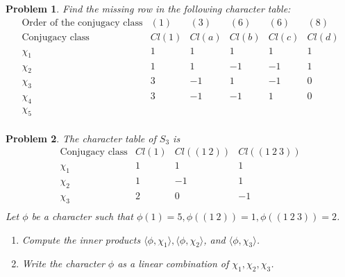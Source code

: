 \documentclass[10pt]{article}
\newcommand{\sk}{\vskip 10mm}
\theoremstyle{plain}
\newtheorem{problem}{Problem}
\theoremstyle{remark}
\begin{document}
\sk

\begin{problem}
  Find the missing row in the following character table:
  \[
    \begin{array}{c|ccccc}
      \text{Order of the conjugacy class} & (1) & (3) & (6) & (6) & (8)\\
      \text{Conjugacy class} & Cl(1) & Cl(a) & Cl(b) & Cl(c) & Cl(d)\\
      \hline
      \chi_1 & 1 & 1 & 1 & 1 & 1\\
      \chi_2 & 1 & 1 & -1 & -1 & 1\\
      \chi_3 & 3 & -1 & 1 & -1 & 0\\
      \chi_4 & 3 & -1 & -1 & 1 & 0\\
      \chi_5 &&&&&\\
    \end{array}
  \]
\end{problem}

\sk

\begin{problem}
  The character table of $S_3$ is
  \[
    \begin{array}{c|ccc}
      \text{Conjugacy class} & Cl(1) & Cl((1\ 2)) & Cl((1\ 2\ 3))\\
      \hline
      \chi_1 & 1 & 1 & 1\\
      \chi_2 & 1 & -1 & 1\\
      \chi_3 & 2 & 0 & -1\\
    \end{array}
  \]
  Let $\phi$ be a character such that
  $\phi(1)=5,\phi((1\ 2))=1,\phi((1\ 2\ 3))=2$.
  \begin{enumerate}
  \item[(a)] Compute the inner products
    $\langle \phi,\chi_1\rangle,\langle \phi,\chi_2\rangle$,
    and $\langle \phi,\chi_3\rangle$.
  \item[(b)] Write the character $\phi$ as a linear combination of
    $\chi_1,\chi_2,\chi_3$.
  \end{enumerate}
\end{problem}

\end{document}
